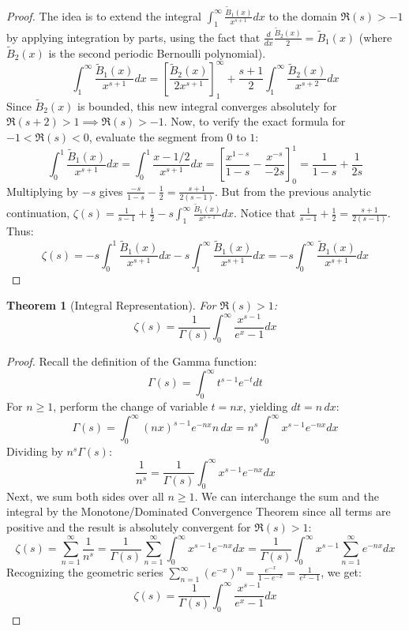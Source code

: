 \documentclass[a4paper,11pt]{article}
\newtheorem{theorem}{Theorem}
\begin{document}
\begin{proof}
  The idea is to extend the integral $\int_1^{\infty}
  \frac{\tilde{B}_1(x)}{x^{s+1}} dx$ to the domain $\Re(s) > -1$ by
  applying integration by parts, using the fact that $\frac{d}{dx}
  \frac{\tilde{B}_2(x)}{2} = \tilde{B}_1(x)$ (where $\tilde{B}_2(x)$
  is the second periodic Bernoulli polynomial).
  \[ \int_{1}^{\infty} \frac{\tilde{B}_1(x)}{x^{s+1}} dx = \left[
    \frac{\tilde{B}_2(x)}{2x^{s+1}} \right]_{1}^{\infty} +
  \frac{s+1}{2} \int_{1}^{\infty} \frac{\tilde{B}_2(x)}{x^{s+2}} dx \]
  Since $\tilde{B}_2(x)$ is bounded, this new integral converges
  absolutely for $\Re(s+2) > 1 \implies \Re(s) > -1$.
  Now, to verify the exact formula for $-1 < \Re(s) < 0$, evaluate
  the segment from $0$ to $1$:
  \[ \int_{0}^{1} \frac{\tilde{B}_1(x)}{x^{s+1}} dx = \int_{0}^{1}
    \frac{x - 1/2}{x^{s+1}} dx = \left[ \frac{x^{1-s}}{1-s} -
  \frac{x^{-s}}{-2s} \right]_{0}^{1} = \frac{1}{1-s} + \frac{1}{2s} \]
  Multiplying by $-s$ gives $\frac{-s}{1-s} - \frac{1}{2} = \frac{s+1}{2(s-1)}$.
  But from the previous analytic continuation, $\zeta(s) =
  \frac{1}{s-1} + \frac{1}{2} - s \int_{1}^{\infty}
  \frac{\tilde{B}_1(x)}{x^{s+1}} dx$. Notice that $\frac{1}{s-1} +
  \frac{1}{2} = \frac{s+1}{2(s-1)}$.
  Thus:
  \[ \zeta(s) = -s \int_{0}^{1} \frac{\tilde{B}_1(x)}{x^{s+1}} dx - s
    \int_{1}^{\infty} \frac{\tilde{B}_1(x)}{x^{s+1}} dx = -s
  \int_{0}^{\infty} \frac{\tilde{B}_1(x)}{x^{s+1}} dx \]
\end{proof}

\begin{theorem}[Integral Representation]
  For $\Re(s) > 1$:
  \[ \zeta(s) = \frac{1}{\Gamma(s)} \int_{0}^{\infty}
  \frac{x^{s-1}}{e^x - 1} dx \]
\end{theorem}

\begin{proof}
  Recall the definition of the Gamma function:
  \[ \Gamma(s) = \int_{0}^{\infty} t^{s-1} e^{-t} dt \]
  For $n \ge 1$, perform the change of variable $t = nx$, yielding
  $dt = n \, dx$:
  \[ \Gamma(s) = \int_{0}^{\infty} (nx)^{s-1} e^{-nx} n \, dx = n^s
  \int_{0}^{\infty} x^{s-1} e^{-nx} dx \]
  Dividing by $n^s \Gamma(s)$:
  \[ \frac{1}{n^s} = \frac{1}{\Gamma(s)} \int_{0}^{\infty} x^{s-1} e^{-nx} dx \]
  Next, we sum both sides over all $n \ge 1$. We can interchange the
  sum and the integral by the Monotone/Dominated Convergence Theorem
  since all terms are positive and the result is absolutely
  convergent for $\Re(s) > 1$:
  \[ \zeta(s) = \sum_{n=1}^{\infty} \frac{1}{n^s} =
    \frac{1}{\Gamma(s)} \sum_{n=1}^{\infty} \int_{0}^{\infty} x^{s-1}
    e^{-nx} dx = \frac{1}{\Gamma(s)} \int_{0}^{\infty} x^{s-1}
  \sum_{n=1}^{\infty} e^{-nx} dx \]
  Recognizing the geometric series $\sum_{n=1}^{\infty} (e^{-x})^n =
  \frac{e^{-x}}{1-e^{-x}} = \frac{1}{e^x - 1}$, we get:
  \[ \zeta(s) = \frac{1}{\Gamma(s)} \int_{0}^{\infty}
  \frac{x^{s-1}}{e^x - 1} dx \]
\end{proof}
\end{document}
